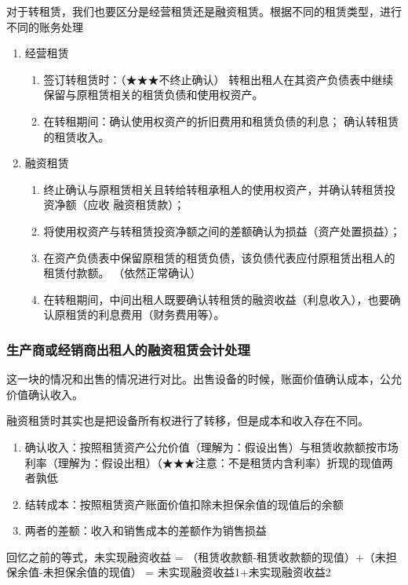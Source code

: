 \documentclass[UTF8,12pt]{ctexart}
\numberwithin{equation}{section} %
\numberwithin{figure}{section}
\numberwithin{table}{section}
\begin{document}
	对于转租赁，我们也要区分是经营租赁还是融资租赁。根据不同的租赁类型，进行不同的账务处理
	\begin{enumerate}
		\item 经营租赁
		\begin{enumerate}
			\item 签订转租赁时：（★★★不终止确认）
			转租出租人在其资产负债表中继续保留与原租赁相关的租赁负债和使用权资产。
			\item 在转租期间：确认使用权资产的折旧费用和租赁负债的利息；	确认转租赁的租赁收入。
		\end{enumerate}
		
		\item 融资租赁
		\begin{enumerate}
			\item 终止确认与原租赁相关且转给转租承租人的使用权资产，并确认转租赁投资净额（应收   融资租赁款）；
			\item 将使用权资产与转租赁投资净额之间的差额确认为损益（资产处置损益）；
			\item 在资产负债表中保留原租赁的租赁负债，该负债代表应付原租赁出租人的租赁付款额。
			（依然正常确认）
			\item 在转租期间，中间出租人既要确认转租赁的融资收益（利息收入），也要确认原租赁的利息费用（财务费用等）。
		\end{enumerate}
	\end{enumerate}

	\subsubsection{生产商或经销商出租人的融资租赁会计处理}
	这一块的情况和出售的情况进行对比。出售设备的时候，账面价值确认成本，公允价值确认收入。
	
	融资租赁时其实也是把设备所有权进行了转移，但是成本和收入存在不同。
	\begin{enumerate}
		\item 确认收入：按照租赁资产公允价值（理解为：假设出售）与租赁收款额按市场利率（理解为：假设出租）（★★★注意：不是租赁内含利率）折现的现值两者孰低
		
		\item 结转成本：按照租赁资产账面价值扣除未担保余值的现值后的余额
		
		\item 两者的差额：收入和销售成本的差额作为销售损益
	\end{enumerate}
	
	回忆之前的等式，未实现融资收益 = （租赁收款额-租赁收款额的现值）+（未担保余值-未担保余值的现值） = 未实现融资收益1+未实现融资收益2
	
\end{document}
